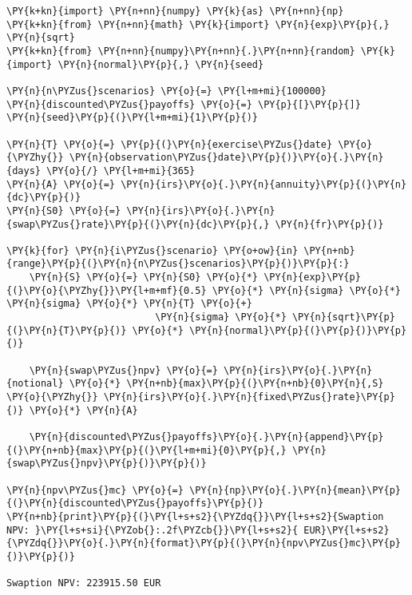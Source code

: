 \begin{tcolorbox}[breakable, size=fbox, boxrule=1pt, pad at break*=1mm,colback=cellbackground, colframe=cellborder]
\begin{Verbatim}[commandchars=\\\{\}]
\PY{k+kn}{import} \PY{n+nn}{numpy} \PY{k}{as} \PY{n+nn}{np}
\PY{k+kn}{from} \PY{n+nn}{math} \PY{k}{import} \PY{n}{exp}\PY{p}{,} \PY{n}{sqrt}
\PY{k+kn}{from} \PY{n+nn}{numpy}\PY{n+nn}{.}\PY{n+nn}{random} \PY{k}{import} \PY{n}{normal}\PY{p}{,} \PY{n}{seed}

\PY{n}{n\PYZus{}scenarios} \PY{o}{=} \PY{l+m+mi}{100000}
\PY{n}{discounted\PYZus{}payoffs} \PY{o}{=} \PY{p}{[}\PY{p}{]}
\PY{n}{seed}\PY{p}{(}\PY{l+m+mi}{1}\PY{p}{)}

\PY{n}{T} \PY{o}{=} \PY{p}{(}\PY{n}{exercise\PYZus{}date} \PY{o}{\PYZhy{}} \PY{n}{observation\PYZus{}date}\PY{p}{)}\PY{o}{.}\PY{n}{days} \PY{o}{/} \PY{l+m+mi}{365}
\PY{n}{A} \PY{o}{=} \PY{n}{irs}\PY{o}{.}\PY{n}{annuity}\PY{p}{(}\PY{n}{dc}\PY{p}{)}
\PY{n}{S0} \PY{o}{=} \PY{n}{irs}\PY{o}{.}\PY{n}{swap\PYZus{}rate}\PY{p}{(}\PY{n}{dc}\PY{p}{,} \PY{n}{fr}\PY{p}{)}
    
\PY{k}{for} \PY{n}{i\PYZus{}scenario} \PY{o+ow}{in} \PY{n+nb}{range}\PY{p}{(}\PY{n}{n\PYZus{}scenarios}\PY{p}{)}\PY{p}{:}
    \PY{n}{S} \PY{o}{=} \PY{n}{S0} \PY{o}{*} \PY{n}{exp}\PY{p}{(}\PY{o}{\PYZhy{}}\PY{l+m+mf}{0.5} \PY{o}{*} \PY{n}{sigma} \PY{o}{*} \PY{n}{sigma} \PY{o}{*} \PY{n}{T} \PY{o}{+}
                          \PY{n}{sigma} \PY{o}{*} \PY{n}{sqrt}\PY{p}{(}\PY{n}{T}\PY{p}{)} \PY{o}{*} \PY{n}{normal}\PY{p}{(}\PY{p}{)}\PY{p}{)}
    
    \PY{n}{swap\PYZus{}npv} \PY{o}{=} \PY{n}{irs}\PY{o}{.}\PY{n}{notional} \PY{o}{*} \PY{n+nb}{max}\PY{p}{(}\PY{n+nb}{0}\PY{n}{,S} \PY{o}{\PYZhy{}} \PY{n}{irs}\PY{o}{.}\PY{n}{fixed\PYZus{}rate}\PY{p}{)} \PY{o}{*} \PY{n}{A}
    
    \PY{n}{discounted\PYZus{}payoffs}\PY{o}{.}\PY{n}{append}\PY{p}{(}\PY{n+nb}{max}\PY{p}{(}\PY{l+m+mi}{0}\PY{p}{,} \PY{n}{swap\PYZus{}npv}\PY{p}{)}\PY{p}{)}
    
\PY{n}{npv\PYZus{}mc} \PY{o}{=} \PY{n}{np}\PY{o}{.}\PY{n}{mean}\PY{p}{(}\PY{n}{discounted\PYZus{}payoffs}\PY{p}{)}
\PY{n+nb}{print}\PY{p}{(}\PY{l+s+s2}{\PYZdq{}}\PY{l+s+s2}{Swaption NPV: }\PY{l+s+si}{\PYZob{}:.2f\PYZcb{}}\PY{l+s+s2}{ EUR}\PY{l+s+s2}{\PYZdq{}}\PY{o}{.}\PY{n}{format}\PY{p}{(}\PY{n}{npv\PYZus{}mc}\PY{p}{)}\PY{p}{)}

Swaption NPV: 223915.50 EUR
\end{Verbatim}
\end{tcolorbox}

